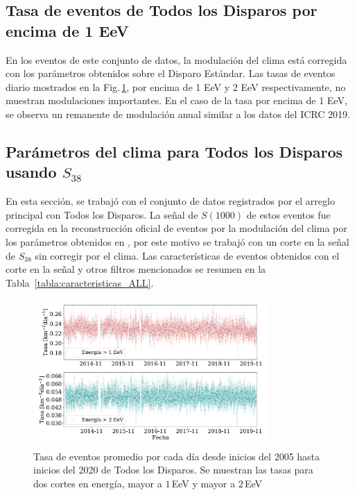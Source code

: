 \subsection{Tasa de eventos de Todos los Disparos por encima de 1 EeV}

En  los eventos de este conjunto de datos, la modulación del clima está corregida con los parámetros obtenidos sobre el Disparo Estándar. Las tasas de eventos diario mostrados en la Fig.\,\ref{fig:rate_ALL}, por encima de 1 EeV y 2 EeV respectivamente, no muestran modulaciones importantes. En el caso de la tasa por encima de 1 EeV, se observa un remanente de modulación anual similar a los datos del ICRC 2019. 




\subsection{Parámetros del clima para Todos los Disparos usando $S_{38}$}


En esta sección, se trabajó con el conjunto de datos registrados por el arreglo principal con Todos los Disparos. La señal de $S(1000)$ de estos eventos fue corregida en la reconstrucción oficial de eventos por la modulación del clima por los parámetros obtenidos en \cite{aab2017impact}, por este motivo se trabajó con un corte en la señal de $S_{38}$ sin corregir por el clima. Las características de eventos obtenidos con el corte en la señal y otros filtros mencionados se resumen en la Tabla~\ref{tabla:caracteristicas_ALL}. 

\begin{figure}[H]
  \centering
  \includegraphics[width=0.8\textwidth]{../04_Clima/Graphs/rate_dayly/AllTriggers_1EeV_2EeV_rate.pdf}
  \caption{Tasa de eventos promedio por cada día desde inicios del 2005 hasta inicios del 2020 de Todos los Disparos. Se muestran las tasas para dos cortes en energía, mayor a $1\,$EeV y mayor a $2\,$EeV}\label{fig:rate_ALL}
\end{figure}

